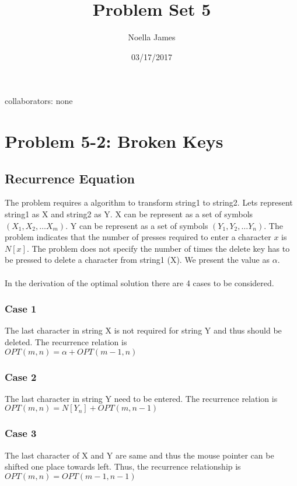 \documentclass{article}
\theoremstyle{definition}
\theoremstyle{remark}
\theoremstyle{plain}
\begin{document}
\title{Problem Set 5}
\date{03/17/2017}
\author{Noella James}
\maketitle
collaborators: none\\

\section*{Problem 5-2: Broken Keys}

\subsection*{Recurrence Equation}

The problem requires a algorithm to transform string1 to string2.  Lets represent string1 as X and string2 as Y.  X can be represent as a set of symbols $(X_1, X_2, \ldots X_m)$. Y can be represent as a set of symbols $(Y_1, Y_2, \ldots Y_n)$.  The problem indicates that the number of presses required to enter a character $x$ is $N[x]$.  The problem does not specify the number of times the delete key has to be pressed to delete a character from string1 (X).  We present the value as $\alpha$. \\\\
In the derivation of the optimal solution there are 4 cases to be considered.\\
\subsubsection*{Case 1}
The last character in string X is not required for string Y and thus should be deleted.  The recurrence relation is\\
$OPT(m,n) = \alpha + OPT(m-1,n)$\\
\subsubsection*{Case 2}
The last character in string Y  need to be entered.  The recurrence relation is\\
$OPT(m,n) = N[Y_n] + OPT(m,n-1)$\\
\subsubsection*{Case 3}
The last character of X and Y are same and thus the mouse pointer can be shifted one place towards left. Thus, the recurrence relationship is\\
$OPT(m,n) = OPT(m-1,n-1)$\\
\end{document}
